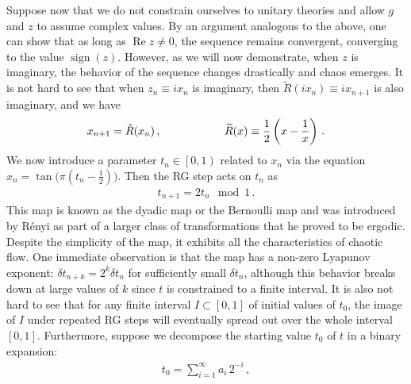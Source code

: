 Suppose now that we do not constrain ourselves to unitary theories and allow $g$ and $z$ to assume complex values. By an argument analogous to the above, one can show that as long as $\operatorname{Re} z \neq 0$, the sequence remains convergent, converging to the value $\operatorname{sign}(z)$. However, as we will now demonstrate, when $z$ is imaginary, the behavior of the sequence changes drastically and chaos emerges. It is not hard to see that when $z_n\equiv i x_n$ is imaginary, then $\widetilde{R}(i x_n)\equiv ix_{n+1}$ is also imaginary, and we have
\begin{gather}
x_{n+1} = \tilde{R}(x_{n})\,,\hspace{20mm} \widetilde{R}(x) \equiv \frac12\left(x-\frac{1}{x}\right)\,.
\end{gather}
We now introduce a parameter $t_n \in \left[0,1\right)$ related to $x_n$ via the equation $x_n = \tan \big(\pi(t_n-\frac12)\big)$. Then the RG step acts on $t_n$ as
\begin{gather}
t_{n+1} = 2 t_n \mod 1\,. \label{tRG}
\end{gather}
This map is known as the dyadic map or the Bernoulli map and was introduced %
by R\'enyi \cite{renyi1957representations} as part of a larger class of transformations that he proved to be ergodic. Despite the simplicity of the map, it exhibits all the characteristics of chaotic flow. One immediate observation is that the map has a non-zero Lyapunov exponent: $\delta t_{n+k} = 2^k \delta t_n$ for sufficiently small $\delta t_n$, although this behavior breaks down at large values of $k$ since $t$ is constrained to a finite interval. It is also not hard to see that for any finite interval $I \subset [0,1]$ of initial values of $t_0$, the image of $I$ under repeated RG steps will eventually spread out over the whole interval $[0,1]$. Furthermore, suppose we decompose the starting value $t_0$ of $t$ in a binary expansion:
\begin{gather}
t_0=\sum_{i=1}^\infty a_i\,2^{-i}\,, 
\end{gather}
